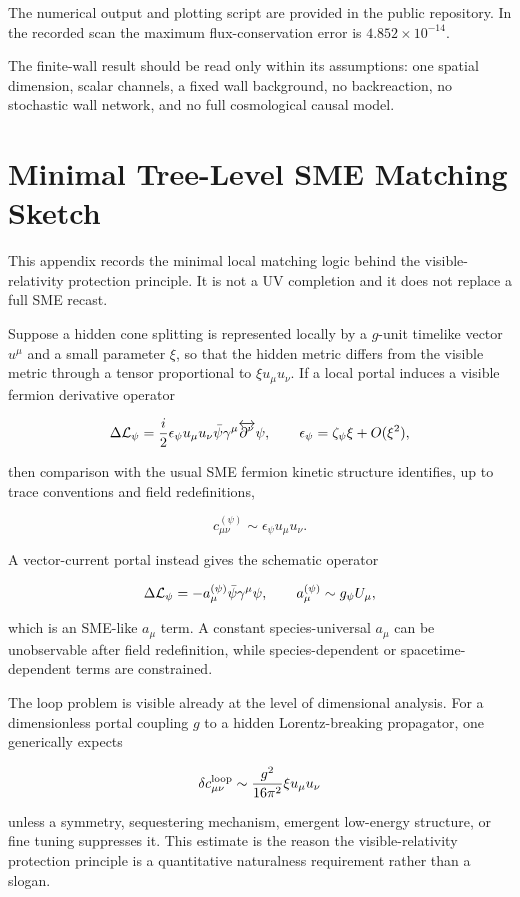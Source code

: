 \documentclass[11pt]{article}
\begin{document}
The numerical output and plotting script are provided in the public repository. In the recorded scan the maximum flux-conservation error is \(4.852\times10^{-14}\).


The finite-wall result should be read only within its assumptions: one spatial dimension, scalar channels, a fixed wall background, no backreaction, no stochastic wall network, and no full cosmological causal model.


\section{Minimal Tree-Level SME Matching Sketch}


This appendix records the minimal local matching logic behind the visible-relativity protection principle. It is not a UV completion and it does not replace a full SME recast.


Suppose a hidden cone splitting is represented locally by a \(g\)-unit timelike vector \(u^\mu\) and a small parameter \(\xi\), so that the hidden metric differs from the visible metric through a tensor proportional to \(\xi u_\mu u_\nu\). If a local portal induces a visible fermion derivative operator


\[
\Delta{\cal L}_\psi=
\frac{i}{2}\epsilon_\psi u_\mu u_\nu
\bar\psi\gamma^\mu\overleftrightarrow{\partial^\nu}\psi,
\qquad
\epsilon_\psi=\zeta_\psi\xi+O(\xi^2),
\]


then comparison with the usual SME fermion kinetic structure identifies, up to trace conventions and field redefinitions,


\[
c_{\mu\nu}^{(\psi)}\sim \epsilon_\psi u_\mu u_\nu .
\]


A vector-current portal instead gives the schematic operator


\[
\Delta{\cal L}_\psi=-a_\mu^{(\psi)}\bar\psi\gamma^\mu\psi,
\qquad
a_\mu^{(\psi)}\sim g_\psi U_\mu ,
\]


which is an SME-like \(a_\mu\) term. A constant species-universal \(a_\mu\) can be unobservable after field redefinition, while species-dependent or spacetime-dependent terms are constrained.


The loop problem is visible already at the level of dimensional analysis. For a dimensionless portal coupling \(g\) to a hidden Lorentz-breaking propagator, one generically expects


\[
\delta c_{\mu\nu}^{\rm loop}
\sim \frac{g^2}{16\pi^2}\xi u_\mu u_\nu
\]


unless a symmetry, sequestering mechanism, emergent low-energy structure, or fine tuning suppresses it. This estimate is the reason the visible-relativity protection principle is a quantitative naturalness requirement rather than a slogan.
\end{document}
